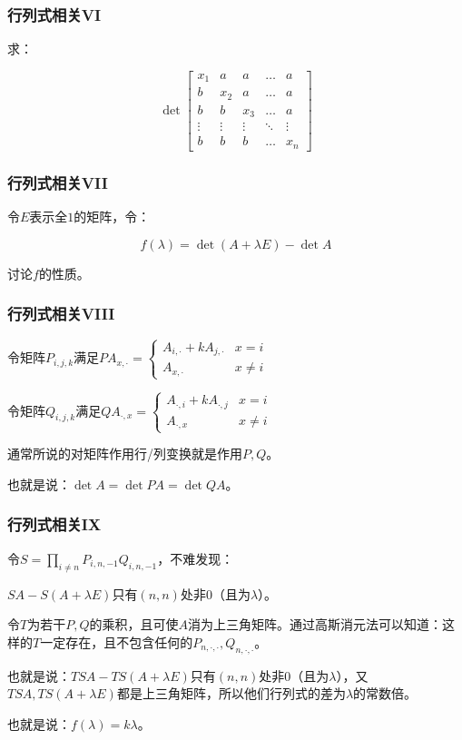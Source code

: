 \documentclass[10pt]{beamer}
\begin{document}
	\begin{frame}
		\frametitle{行列式相关VI}
	
		求：

		$$
		\det\begin{bmatrix}x_1&a&a&\dots&a\\b&x_2&a&\dots&a\\b&b&x_3&\dots&a\\\vdots&\vdots&\vdots&\ddots&\vdots\\b&b&b&\dots&x_n\end{bmatrix}
		$$
	
	\end{frame}
	\begin{frame}
		\frametitle{行列式相关VII}
	
		令$E$表示全$1$的矩阵，令：

		$$
		f(\lambda)=\det (A+\lambda E)-\det A
		$$

		讨论$f$的性质。

	\end{frame}
	\begin{frame}
		\frametitle{行列式相关VIII}
	
		令矩阵$P_{i,j,k}$满足$PA_{x,\cdot}=\begin{cases}A_{i,\cdot}+kA_{j,\cdot}&x=i\\A_{x,\cdot}&x\not=i\end{cases}$

		令矩阵$Q_{i,j,k}$满足$QA_{\cdot,x}=\begin{cases}A_{\cdot,i}+kA_{\cdot,j}&x=i\\A_{\cdot,x}&x\not=i\end{cases}$

		通常所说的对矩阵作用行/列变换就是作用$P,Q$。

		也就是说：$\det A=\det PA=\det QA$。

	\end{frame}
	\begin{frame}
		\frametitle{行列式相关IX}
	
		令$S=\prod_{i\not=n}P_{i,n,-1}Q_{i,n,-1}$，不难发现：

		$SA-S(A+\lambda E)$只有$(n,n)$处非$0$（且为$\lambda$）。

		令$T$为若干$P,Q$的乘积，且可使$A$消为上三角矩阵。通过高斯消元法可以知道：这样的$T$一定存在，且不包含任何的$P_{n,\cdot,\cdot},Q_{n,\cdot,\cdot}$。

		也就是说：$TSA-TS(A+\lambda E)$只有$(n,n)$处非$0$（且为$\lambda$），又$TSA,TS(A+\lambda E)$都是上三角矩阵，所以他们行列式的差为$\lambda$的常数倍。

		也就是说：$f(\lambda)=k\lambda$。
	
	\end{frame}
\end{document}
